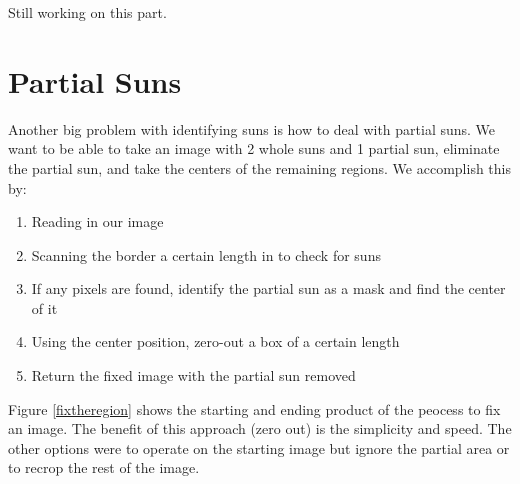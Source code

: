 \documentclass[10pt]{scrartcl}
\begin{document}
Still working on this part. 



\section{Partial Suns} %
\label{sec:partial_suns}
Another big problem with identifying suns is how to deal with partial suns. We want to be able to take an image with 2 whole suns and 1 partial sun, eliminate the partial sun, and take the centers of the remaining regions. We accomplish this by:

\begin{enumerate}
    \item Reading in our image
    \item Scanning the border a certain length in to check for suns
    \item If any pixels are found, identify the partial sun as a mask and find the center of it
    \item Using the center position, zero-out a box of a certain length
    \item Return the fixed image with the partial sun removed
\end{enumerate}

Figure \ref{fixtheregion} shows the starting and ending product of the peocess to fix an image. The benefit of this approach (zero out) is the simplicity and speed. The other options were to operate on the starting image but ignore the partial area or to recrop the rest of the image.
\end{document}
